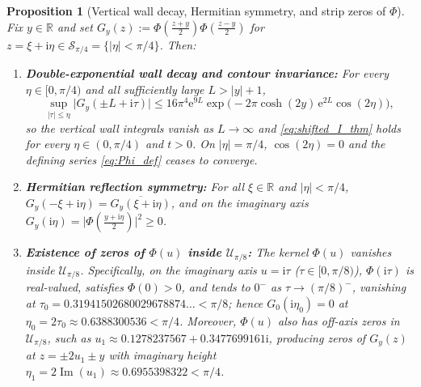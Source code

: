 \documentclass[11pt,a4paper,reqno]{amsart}
\newtheorem{proposition}[theorem]{Proposition}
\theoremstyle{definition}
\theoremstyle{remark}
\numberwithin{equation}{section}
\newcommand{\ii}{\mathrm{i}}
\newcommand{\ee}{\mathrm{e}}
\newcommand{\Ima}{\operatorname{Im}}
\begin{document}
\begin{proposition}[Vertical wall decay, Hermitian symmetry, and strip zeros of $\Phi$]\label{prop:wall_decay}
Fix $y \in \mathbb{R}$ and set $G_y(z) := \Phi\!\left(\frac{z+y}{2}\right)\Phi\!\left(\frac{z-y}{2}\right)$ for $z = \xi + \ii\eta \in \mathcal{S}_{\pi/4} = \{|\eta| < \pi/4\}$. Then:
\begin{enumerate}
\item[\textup{(a)}] \textbf{Double-exponential wall decay and contour invariance:} For every $\eta \in [0,\pi/4)$ and all sufficiently large $L > |y| + 1$,
\begin{equation}\label{eq:wall_bound}
\sup_{|\tau| \le \eta} \big|G_y(\pm L + \ii\tau)\big| \le 16\pi^4 \ee^{9L}\exp\!\Big(-2\pi\cosh(2y)\,\ee^{2L}\cos(2\eta)\Big),
\end{equation}
so the vertical wall integrals vanish as $L \to \infty$ and \eqref{eq:shifted_I_thm} holds for every $\eta \in (0,\pi/4)$ and $t > 0$. On $|\eta| = \pi/4$, $\cos(2\eta) = 0$ and the defining series \eqref{eq:Phi_def} ceases to converge.
\item[\textup{(b)}] \textbf{Hermitian reflection symmetry:} For all $\xi \in \mathbb{R}$ and $|\eta| < \pi/4$, $G_y(-\xi + \ii\eta) = \overline{G_y(\xi + \ii\eta)}$, and on the imaginary axis $G_y(\ii\eta) = \big|\Phi(\frac{y+\ii\eta}{2})\big|^2 \ge 0$.
\item[\textup{(c)}] \textbf{Existence of zeros of $\Phi(u)$ inside $\mathcal{U}_{\pi/8}$:} The kernel $\Phi(u)$ vanishes inside $\mathcal{U}_{\pi/8}$. Specifically, on the imaginary axis $u = \ii\tau$ ($\tau \in [0,\pi/8)$), $\Phi(\ii\tau)$ is real-valued, satisfies $\Phi(0) > 0$, and tends to $0^-$ as $\tau \to (\pi/8)^-$, vanishing at $\tau_0 = 0.31941502680029678874\dots < \pi/8$; hence $G_0(\ii\eta_0) = 0$ at $\eta_0 = 2\tau_0 \approx 0.6388300536 < \pi/4$. Moreover, $\Phi(u)$ also has off-axis zeros in $\mathcal{U}_{\pi/8}$, such as $u_1 \approx 0.1278237567 + 0.3477699161\ii$, producing zeros of $G_y(z)$ at $z = \pm 2u_1 \pm y$ with imaginary height $\eta_1 = 2\Ima(u_1) \approx 0.6955398322 < \pi/4$.
\end{enumerate}
\end{proposition}
\end{document}
